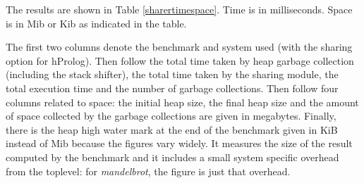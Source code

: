 \documentclass{tlp}
\begin{document}
The results are shown in Table \ref{sharertimespace}. Time is in
milliseconds. Space is in Mib or Kib as indicated in the table.

The first two columns denote the benchmark and system used (with the
sharing option for hProlog). Then follow the total time taken by heap
garbage collection (including the stack shifter), the total time taken
by the sharing module, the total execution time and the number of
garbage collections. Then follow four columns related to space: the
initial heap size, the final heap size and the amount of space
collected by the garbage collections are given in megabytes. Finally,
there is the heap high water mark at the end of the benchmark given in
KiB instead of Mib because the figures vary widely. It measures the
size of the result computed by the benchmark and it includes a small
system specific overhead from the toplevel: for {\em mandelbrot}, the
figure is just that overhead.
\end{document}

